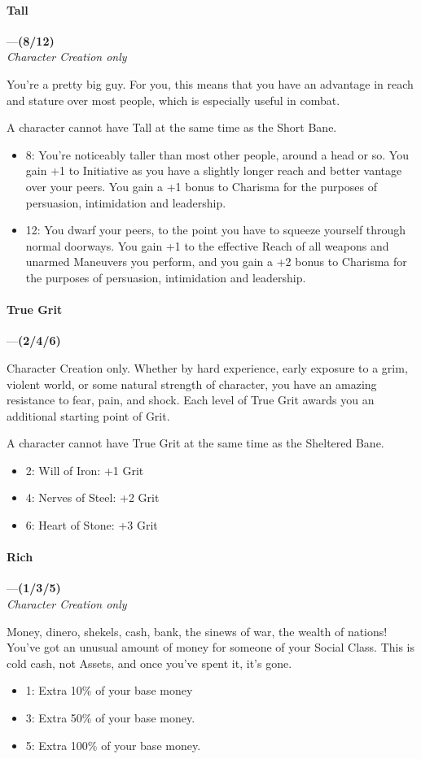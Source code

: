 \documentclass[oneside,11pt,english]{book}
\begin{document}
\paragraph{\label{boon:Tall}Tall}---\quad\textbf{(8/12) }\\
\textit{Character Creation only}\par
You're a pretty big guy. For you, this means that you have an advantage in reach and stature over most 
people, which is especially useful in combat. 


A character cannot have Tall at the same time as the Short Bane. 
\begin{itemize}
\item 8: You’re noticeably taller than most other people, around a head or so. 
You gain +1 to Initiative as you have a slightly longer reach and better vantage over your peers. You gain a +1 bonus to Charisma for the purposes of persuasion, intimidation and leadership.
\item 12: You dwarf your peers, to the point you have to squeeze yourself through normal doorways. You gain +1 to the effective Reach of all weapons and unarmed Maneuvers you perform, and you gain a +2 bonus to Charisma for the purposes of persuasion, intimidation and leadership.
\end{itemize}
\paragraph{\label{boon:True Grit}True Grit}---\quad\textbf{(2/4/6) }\par
Character Creation only. 
Whether by hard experience, early exposure to a grim, violent world, or some natural strength of 
character, you have an amazing resistance to fear, pain, and shock. Each level of True Grit awards you an 
additional starting point of Grit. 


A character cannot have True Grit at the same time as the Sheltered Bane. 
\begin{itemize}
\item 2: Will of Iron: +1 Grit 
\item 4: Nerves of Steel: +2 Grit 
\item 6: Heart of Stone: +3 Grit 
\end{itemize}
\paragraph{\label{boon:Rich}Rich}---\quad\textbf{(1/3/5) }\\
\textit{Character Creation only}\par
Money, dinero, shekels, cash, bank, the sinews of war, the wealth of nations! You've got an unusual 
amount of money for someone of your Social Class. This is cold cash, not Assets, and once you've spent 
it, it's gone. 
\begin{itemize}
\item 1: Extra 10\% of your base money 
\item 3: Extra 50\% of your base money. 
\item 5: Extra 100\% of your base money. 
\end{itemize}
\end{document}
